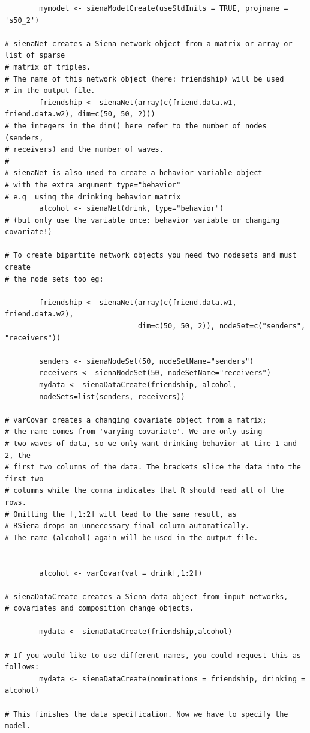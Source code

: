 \documentclass[a4paper,fleqn]{article}
\newcommand{\+}{\, + \,}
\begin{document}
{\begin{verbatim}
        mymodel <- sienaModelCreate(useStdInits = TRUE, projname = 's50_2')

# sienaNet creates a Siena network object from a matrix or array or list of sparse
# matrix of triples.
# The name of this network object (here: friendship) will be used
# in the output file.
        friendship <- sienaNet(array(c(friend.data.w1, friend.data.w2), dim=c(50, 50, 2)))
# the integers in the dim() here refer to the number of nodes (senders,
# receivers) and the number of waves.
#
# sienaNet is also used to create a behavior variable object
# with the extra argument type="behavior"
# e.g  using the drinking behavior matrix
        alcohol <- sienaNet(drink, type="behavior")
# (but only use the variable once: behavior variable or changing covariate!)

# To create bipartite network objects you need two nodesets and must create
# the node sets too eg:

        friendship <- sienaNet(array(c(friend.data.w1, friend.data.w2),
                               dim=c(50, 50, 2)), nodeSet=c("senders", "receivers"))

        senders <- sienaNodeSet(50, nodeSetName="senders")
        receivers <- sienaNodeSet(50, nodeSetName="receivers")
        mydata <- sienaDataCreate(friendship, alcohol,
        nodeSets=list(senders, receivers))

# varCovar creates a changing covariate object from a matrix;
# the name comes from 'varying covariate'. We are only using
# two waves of data, so we only want drinking behavior at time 1 and 2, the
# first two columns of the data. The brackets slice the data into the first two
# columns while the comma indicates that R should read all of the rows.
# Omitting the [,1:2] will lead to the same result, as
# RSiena drops an unnecessary final column automatically.
# The name (alcohol) again will be used in the output file.


        alcohol <- varCovar(val = drink[,1:2])

# sienaDataCreate creates a Siena data object from input networks,
# covariates and composition change objects.

        mydata <- sienaDataCreate(friendship,alcohol)

# If you would like to use different names, you could request this as follows:
        mydata <- sienaDataCreate(nominations = friendship, drinking = alcohol)

# This finishes the data specification. Now we have to specify the model.


\end{verbatim}}
\end{document}
